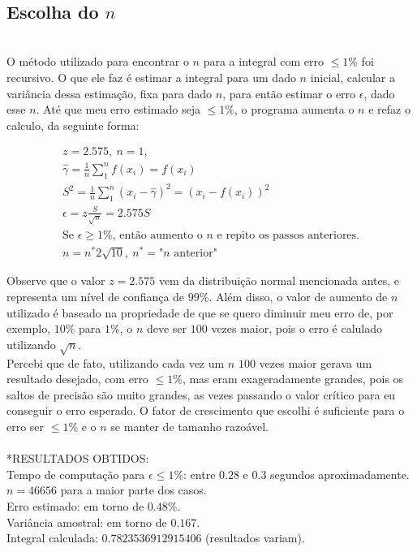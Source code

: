 \documentclass[pt12]{article}
\begin{document}
\ \\

\subsection{Escolha do $n$}
\ \\
O método utilizado para encontrar o $n$ para a integral com erro $\leq 1\%$ foi recursivo. O que ele faz é estimar a integral para um dado $n$ inicial, calcular a variância dessa estimação, fixa para dado $n$, para então estimar o erro $\epsilon$, dado esse $n$. Até que meu erro estimado seja $\leq 1\%$, o programa aumenta o $n$ e refaz o calculo, da seguinte forma:

\begin{align}
z = 2.575, \ n = 1 ,\\
\hat{\gamma}=\frac{1}{n}\sum_{1}^{n}f(x_i)=f(x_i)\\
S^2 = \frac{1}{n}\sum_{1}^{n}(x_i-\hat{\gamma})^2=(x_i-f(x_i))^2\\
\epsilon = z\frac{S}{\sqrt{n}}=2.575S\\
\text{Se $\epsilon \geq 1\%$, então aumento o $n$ e repito os passos anteriores.}\\
n = n^{*}2\sqrt{10},\ n^{*} = \text{"$n$ anterior"}
\end{align}

Observe que o valor $z=2.575$ vem da distribuição normal mencionada antes, e representa um nível de confiança de $99\%$. Além disso, o valor de aumento de $n$ utilizado é baseado na propriedade de que se quero diminuir meu erro de, por exemplo, $10\%$ para $1\%$, o $n$ deve ser $100$ vezes maior, pois o erro é calulado utilizando $\sqrt{n}$.\\
\indent Percebi que de fato, utilizando cada vez um $n$ $100$ vezes maior gerava um resultado desejado, com erro $\leq 1\%$, mas eram exageradamente grandes, pois os saltos de precisão são muito grandes, as vezes passando o valor crítico para eu conseguir o erro esperado. O fator de crescimento que escolhi é suficiente para o erro ser $\leq 1\%$ e o $n$ se manter de tamanho razoável.\\
\ \\

*RESULTADOS OBTIDOS: \\
Tempo de computação para $\epsilon \leq 1\%$: entre $0.28$ e $0.3$ segundos aproximadamente. \\
$n = 46656$ para a maior parte dos casos. \\
Erro estimado: em torno de $0.48\%$.\\
Variância amostral: em torno de $0.167$.\\
Integral calculada: $0.7823536912915406$ (resultados variam).\\
\ \\
\end{document}
